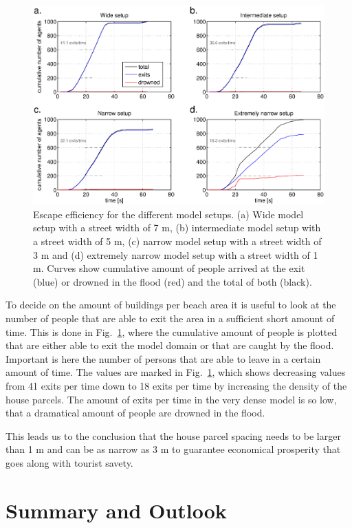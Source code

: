 \documentclass[11pt]{article}
\begin{document}
\begin{figure}
	\centering
	\includegraphics[width=1.1\textwidth]{figures/AnalysisMULTI_BeachEvacuationOneExitStreetWidth1_Flood0_1.eps}
	\caption{Escape efficiency for the different model setups. (a) Wide model setup with a street width of 7 m, (b) intermediate model setup with a street width of 5 m, (c) narrow model setup with a street width of 3 m and (d) extremely narrow model setup with a street width of 1 m. Curves show cumulative amount of people arrived at the exit (blue) or drowned in the flood (red) and the total of both (black).}
	\label{fig:analysis_1}
\end{figure}

To decide on the amount of buildings per beach area it is useful to look at the number of people that are able to exit the area in a sufficient short amount of time. This is done in Fig.~\ref{fig:analysis_1}, where the cumulative amount of people is plotted that are either able to exit the model domain or that are caught by the flood. Important is here the number of persons that are able to leave in a certain amount of time. The values are marked in Fig.~\ref{fig:analysis_1}, which shows decreasing values from 41 exits per time down to 18 exits per time by increasing the density of the house parcels. The amount of exits per time in the very dense model is so low, that a dramatical amount of people are drowned in the flood.

This leads us to the conclusion that the house parcel spacing needs to be larger than 1 m and can be as narrow as 3 m to guarantee economical prosperity that goes along with tourist savety.


\section{Summary and Outlook}
\end{document}

